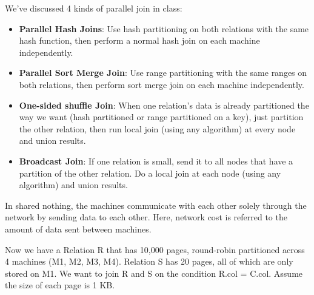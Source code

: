 \documentclass[paper=a4, fontsize=11pt]{scrartcl}
\numberwithin{equation}{section}		%
\numberwithin{figure}{section}			%
\numberwithin{table}{section}				%
\begin{document}
We've discussed 4 kinds of parallel join in class:
\begin{itemize}
    \item \textbf{Parallel Hash Joins}: Use hash partitioning on both relations with the same hash function, then perform a normal hash join on each machine independently.
    \item \textbf{Parallel Sort Merge Join}: Use range partitioning with the same ranges on both relations, then perform sort merge join on each machine independently.
    \item \textbf{One-sided shuffle Join}: When one relation's data is already partitioned the way we want (hash partitioned or range partitioned on a key), just partition the other relation, then run local join (using any algorithm) at every node and union results.
    \item \textbf{Broadcast Join}: If one relation is small, send it to all nodes that have a partition of the other relation. Do a local join at each node (using any algorithm) and union results.
\end{itemize}

\par In shared nothing, the machines communicate with each other solely through the network by sending data to each other. Here, network cost is referred to the amount of data sent between machines. 
\par Now we have a Relation R that has 10,000 pages, round-robin partitioned across 4 machines (M1, M2, M3, M4). Relation S has 20 pages, all of which are only stored on M1. We want to join R and S on the condition R.col = C.col. Assume the size of each page is 1 KB. 
\end{document}
